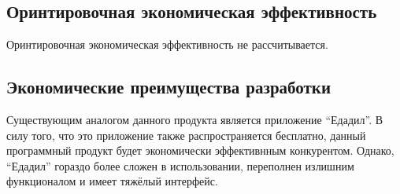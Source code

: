 \subsection{Оринтировочная экономическая эффективность}
Оринтировочная экономическая эффективность не рассчитывается.

\subsection{Экономические преимущества разработки}
Существующим аналогом данного продукта является приложение ``Едадил''. В силу
того, что это приложение также распространяется бесплатно, данный программный
продукт будет экономически эффективнным конкурентом. Однако, ``Едадил'' гораздо
более сложен в использовании, переполнен излишним функционалом и имеет тяжёлый
интерфейс.
